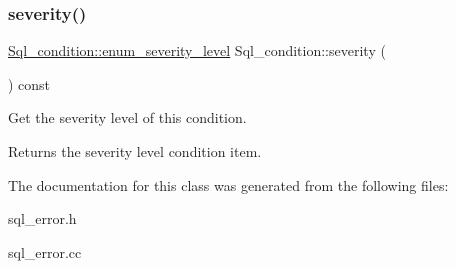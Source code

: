 \subsubsection{\texorpdfstring{severity()}{severity()}}
{\footnotesize\ttfamily \mbox{\hyperlink{classSql__condition_ab0602581e19cddb609bfe10c44be4e83}{Sql\+\_\+condition\+::enum\+\_\+severity\+\_\+level}} Sql\+\_\+condition\+::severity (\begin{DoxyParamCaption}{ }\end{DoxyParamCaption}) const\hspace{0.3cm}{\ttfamily [inline]}}

Get the severity level of this condition. \begin{DoxyReturn}{Returns}
the severity level condition item. 
\end{DoxyReturn}


The documentation for this class was generated from the following files\+:\begin{DoxyCompactItemize}
\item 
sql\+\_\+error.\+h\item 
sql\+\_\+error.\+cc\end{DoxyCompactItemize}
